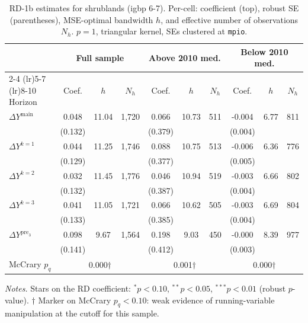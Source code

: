 \documentclass[11pt]{article}
\begin{document}
\begin{table}[H]
\centering
\scriptsize
\caption{RD-1b estimates for shrublands (igbp 6-7). Per-cell: coefficient
(top), robust SE (parentheses), MSE-optimal bandwidth $h$, and
effective number of observations $N_h$. $p=1$, triangular kernel,
SEs clustered at \texttt{mpio}.}
\label{tab:rdplot_rd1b_shrublands}
\begin{tabular}{l ccc ccc ccc}
\toprule
 & \multicolumn{3}{c}{Full sample} & \multicolumn{3}{c}{Above 2010 med.} & \multicolumn{3}{c}{Below 2010 med.} \\
\cmidrule(lr){2-4} \cmidrule(lr){5-7} \cmidrule(lr){8-10}
Horizon & Coef. & $h$ & $N_h$ & Coef. & $h$ & $N_h$ & Coef. & $h$ & $N_h$ \\
\midrule
$\Delta Y^{\text{main}}$ & 0.048 & 11.04 & 1,720 & 0.066 & 10.73 & 511 & -0.004 & 6.77 & 811 \\
 & (0.132) &  &  & (0.379) &  &  & (0.004) &  &  \\
\addlinespace[1pt]
$\Delta Y^{k=1}$ & 0.044 & 11.25 & 1,746 & 0.088 & 10.75 & 513 & -0.006 & 6.36 & 776 \\
 & (0.129) &  &  & (0.377) &  &  & (0.005) &  &  \\
\addlinespace[1pt]
$\Delta Y^{k=2}$ & 0.032 & 11.45 & 1,776 & 0.046 & 10.94 & 519 & -0.003 & 6.66 & 802 \\
 & (0.132) &  &  & (0.387) &  &  & (0.004) &  &  \\
\addlinespace[1pt]
$\Delta Y^{k=3}$ & 0.041 & 11.05 & 1,721 & 0.066 & 10.62 & 505 & -0.003 & 6.69 & 804 \\
 & (0.133) &  &  & (0.385) &  &  & (0.004) &  &  \\
\addlinespace[1pt]
$\Delta Y^{\text{pre}_3}$ & 0.098 & 9.67 & 1,564 & 0.198 & 9.03 & 450 & -0.000 & 8.39 & 977 \\
 & (0.141) &  &  & (0.412) &  &  & (0.003) &  &  \\
\addlinespace[1pt]
\midrule
McCrary $p_q$ & \multicolumn{3}{c}{0.000$\dagger$} & \multicolumn{3}{c}{0.001$\dagger$} & \multicolumn{3}{c}{0.000$\dagger$} \\
\bottomrule
\end{tabular}
\begin{flushleft}\footnotesize
\textit{Notes.} Stars on the RD coefficient: $^{*}p<0.10$,
$^{**}p<0.05$, $^{***}p<0.01$ (robust $p$-value).
$\dagger$ Marker on McCrary $p_q<0.10$: weak evidence of running-variable manipulation at the cutoff for this sample.\\
\end{flushleft}
\end{table}
\end{document}
